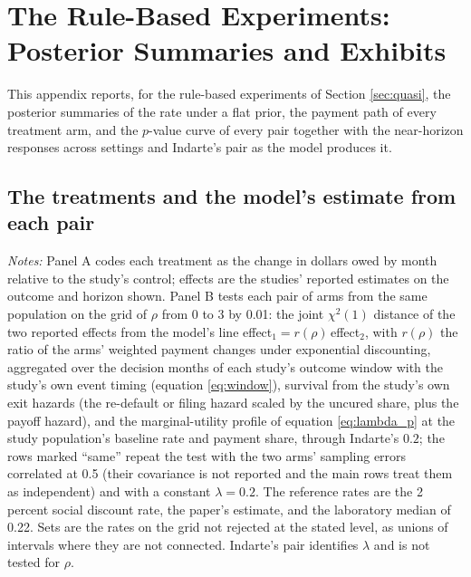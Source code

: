 \section{The Rule-Based Experiments: Posterior Summaries and Exhibits}\label{appendix:experiments}

This appendix reports, for the rule-based experiments of Section \ref{sec:quasi}, the posterior summaries of the rate under a flat prior, the payment path of every treatment arm, and the $p$-value curve of every pair together with the near-horizon responses across settings and Indarte's pair as the model produces it.

\subsection{The treatments and the model's estimate from each pair}

\begin{table}[H]
\centering
\caption{Rule-based experiments as payment-path treatments, and the model's estimate from each pair}
\label{tab:experiments}
\resizebox{\textwidth}{!}{}
\vspace{0.5em}
\begin{minipage}{0.95\textwidth}
\small \textit{Notes:} Panel A codes each treatment as the change in dollars owed by month relative to the study's control; effects are the studies' reported estimates on the outcome and horizon shown. Panel B tests each pair of arms from the same population on the grid of $\rho$ from 0 to 3 by 0.01: the joint $\chi^2(1)$ distance of the two reported effects from the model's line effect$_1 = r(\rho)\,$effect$_2$, with $r(\rho)$ the ratio of the arms' weighted payment changes under exponential discounting, aggregated over the decision months of each study's outcome window with the study's own event timing (equation \eqref{eq:window}), survival from the study's own exit hazards (the re-default or filing hazard scaled by the uncured share, plus the payoff hazard), and the marginal-utility profile of equation \eqref{eq:lambda_p} at the study population's baseline rate and payment share, through Indarte's $0.2$; the rows marked ``same'' repeat the test with the two arms' sampling errors correlated at 0.5 (their covariance is not reported and the main rows treat them as independent) and with a constant $\lambda = 0.2$. The reference rates are the 2 percent social discount rate, the paper's estimate, and the laboratory median of 0.22. Sets are the rates on the grid not rejected at the stated level, as unions of intervals where they are not connected. Indarte's pair identifies $\lambda$ and is not tested for $\rho$.
\end{minipage}
\end{table}

